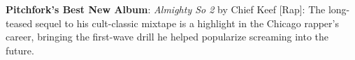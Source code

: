 \textbf{Pitchfork's Best New Album}: \textit{Almighty So 2} by Chief Keef [Rap]: The long-teased sequel to his cult-classic mixtape is a highlight in the Chicago rapper{\textquoteright}s career, bringing the first-wave drill he helped popularize screaming into the future.